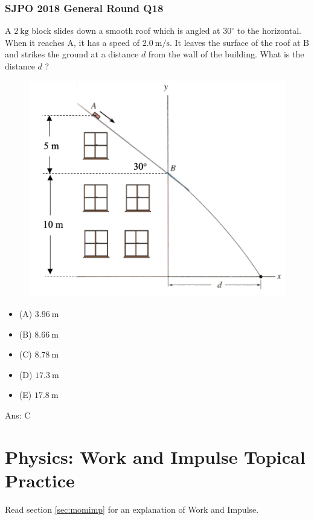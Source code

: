 \documentclass{article}
\begin{document}
\begin{samepage}
\newpage \clearpage
\subsubsection{SJPO 2018 General Round Q18}
A $2 \mathrm{~kg}$ block slides down a smooth roof which is angled at $30^{\circ}$ to the horizontal. When it reaches $\mathrm{A}$, it has a speed of $2.0 \mathrm{~m} / \mathrm{s}$. It leaves the surface of the roof at $\mathrm{B}$ and strikes the ground at a distance $d$ from the wall of the building. What is the distance $d$ ? \\
{
 \begin{figure} 
\includegraphics[width=\linewidth]{images/2018q18.png}
\end{figure}
\begin{itemize}
\item[](A) $3.96 \mathrm{~m}$
\item[](B) $8.66 \mathrm{~m}$
\item[](C) $8.78 \mathrm{~m}$
\item[](D) $17.3 \mathrm{~m}$
\item[](E) $17.8 \mathrm{~m}$
\end{itemize}
}
Ans: \ifpaper C \fi \\[10pt]
\end{samepage}



\section{Physics: Work and Impulse Topical Practice}
Read section \ref{sec:momimp} for an explanation of Work and Impulse.
\end{document}
